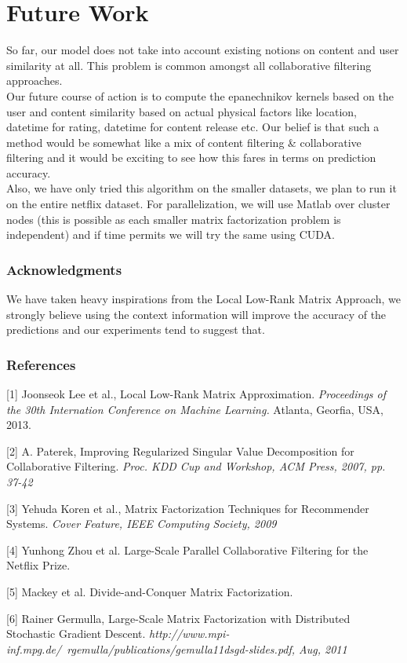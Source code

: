\documentclass{article} %
\begin{document}
\section{Future Work}
So far, our model does not take into account existing notions on content and user similarity at all. This problem is common amongst all collaborative filtering approaches.\\
Our future course of action is to compute the epanechnikov kernels based on the user and content similarity based on actual physical factors like location, datetime for rating, datetime for content release etc.  Our belief is that such a method would be somewhat like a mix of content filtering \& collaborative filtering and it would be exciting to see how this fares in terms on prediction accuracy.\\
Also, we have only tried this algorithm on the smaller datasets, we plan to run it on the entire netflix dataset. For parallelization, we will use Matlab over cluster nodes (this is possible as each smaller matrix factorization problem is independent) and if time permits we will try the same using CUDA. 

\subsubsection*{Acknowledgments}
We have taken heavy inspirations from the Local Low-Rank Matrix Approach, we strongly believe using the context information will improve the accuracy of the predictions and our experiments tend to suggest that.

\subsubsection*{References}


\small{
[1] Joonseok Lee et al., Local Low-Rank Matrix Approximation. {\it Proceedings of the 30th Internation Conference on Machine Learning.} Atlanta, Georfia, USA, 2013.

[2] A. Paterek, Improving Regularized Singular Value Decomposition for Collaborative Filtering. {\it Proc. KDD Cup and Workshop, ACM Press, 2007, pp. 37-42}

[3] Yehuda Koren et al., Matrix Factorization Techniques for Recommender Systems. {\it Cover Feature, IEEE Computing Society, 2009}

[4] Yunhong Zhou et al. Large-Scale Parallel Collaborative Filtering for the Netflix Prize.

[5] Mackey et al. Divide-and-Conquer Matrix Factorization.

[6] Rainer Germulla, Large-Scale Matrix Factorization with Distributed Stochastic Gradient Descent. {\it http://www.mpi-inf.mpg.de/~rgemulla/publications/gemulla11dsgd-slides.pdf, Aug, 2011}
}
\end{document}
